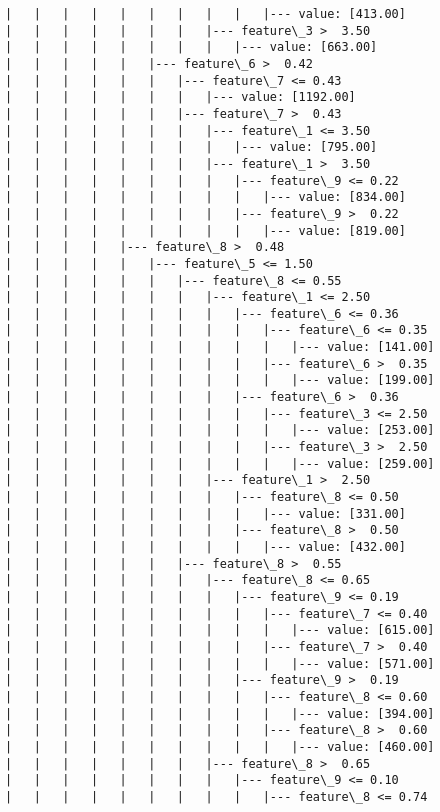 \documentclass[11pt]{article}
\begin{document}
\begin{Verbatim}[commandchars=\\\{\}]
|   |   |   |   |   |   |   |   |   |--- value: [413.00]
|   |   |   |   |   |   |   |--- feature\_3 >  3.50
|   |   |   |   |   |   |   |   |--- value: [663.00]
|   |   |   |   |   |--- feature\_6 >  0.42
|   |   |   |   |   |   |--- feature\_7 <= 0.43
|   |   |   |   |   |   |   |--- value: [1192.00]
|   |   |   |   |   |   |--- feature\_7 >  0.43
|   |   |   |   |   |   |   |--- feature\_1 <= 3.50
|   |   |   |   |   |   |   |   |--- value: [795.00]
|   |   |   |   |   |   |   |--- feature\_1 >  3.50
|   |   |   |   |   |   |   |   |--- feature\_9 <= 0.22
|   |   |   |   |   |   |   |   |   |--- value: [834.00]
|   |   |   |   |   |   |   |   |--- feature\_9 >  0.22
|   |   |   |   |   |   |   |   |   |--- value: [819.00]
|   |   |   |   |--- feature\_8 >  0.48
|   |   |   |   |   |--- feature\_5 <= 1.50
|   |   |   |   |   |   |--- feature\_8 <= 0.55
|   |   |   |   |   |   |   |--- feature\_1 <= 2.50
|   |   |   |   |   |   |   |   |--- feature\_6 <= 0.36
|   |   |   |   |   |   |   |   |   |--- feature\_6 <= 0.35
|   |   |   |   |   |   |   |   |   |   |--- value: [141.00]
|   |   |   |   |   |   |   |   |   |--- feature\_6 >  0.35
|   |   |   |   |   |   |   |   |   |   |--- value: [199.00]
|   |   |   |   |   |   |   |   |--- feature\_6 >  0.36
|   |   |   |   |   |   |   |   |   |--- feature\_3 <= 2.50
|   |   |   |   |   |   |   |   |   |   |--- value: [253.00]
|   |   |   |   |   |   |   |   |   |--- feature\_3 >  2.50
|   |   |   |   |   |   |   |   |   |   |--- value: [259.00]
|   |   |   |   |   |   |   |--- feature\_1 >  2.50
|   |   |   |   |   |   |   |   |--- feature\_8 <= 0.50
|   |   |   |   |   |   |   |   |   |--- value: [331.00]
|   |   |   |   |   |   |   |   |--- feature\_8 >  0.50
|   |   |   |   |   |   |   |   |   |--- value: [432.00]
|   |   |   |   |   |   |--- feature\_8 >  0.55
|   |   |   |   |   |   |   |--- feature\_8 <= 0.65
|   |   |   |   |   |   |   |   |--- feature\_9 <= 0.19
|   |   |   |   |   |   |   |   |   |--- feature\_7 <= 0.40
|   |   |   |   |   |   |   |   |   |   |--- value: [615.00]
|   |   |   |   |   |   |   |   |   |--- feature\_7 >  0.40
|   |   |   |   |   |   |   |   |   |   |--- value: [571.00]
|   |   |   |   |   |   |   |   |--- feature\_9 >  0.19
|   |   |   |   |   |   |   |   |   |--- feature\_8 <= 0.60
|   |   |   |   |   |   |   |   |   |   |--- value: [394.00]
|   |   |   |   |   |   |   |   |   |--- feature\_8 >  0.60
|   |   |   |   |   |   |   |   |   |   |--- value: [460.00]
|   |   |   |   |   |   |   |--- feature\_8 >  0.65
|   |   |   |   |   |   |   |   |--- feature\_9 <= 0.10
|   |   |   |   |   |   |   |   |   |--- feature\_8 <= 0.74

\end{Verbatim}
\end{document}

